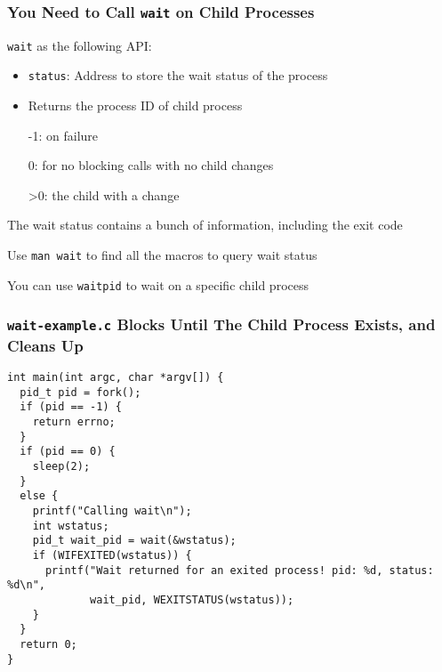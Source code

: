   \begin{frame}
    \frametitle{You Need to Call \texttt{wait} on Child Processes}

    \texttt{wait} as the following API:
    \begin{itemize}
      \item \texttt{status}: Address to store the wait status of the process
      \item Returns the process ID of child process

            \hspace{2em} -1: on failure

            \hspace{2em} 0: for no blocking calls with no child changes

            \hspace{2em} >0: the child with a change
    \end{itemize}

    \vspace{2em}

    The wait status contains a bunch of information, including the exit code

    \hspace{2em} Use \texttt{man wait} to find all the macros to query wait status

    \hspace{4em} You can use \texttt{waitpid} to wait on a specific child process
  \end{frame}

  \begin{frame}[fragile]
    \frametitle{\texttt{wait-example.c} Blocks Until The Child Process Exists, and Cleans Up}

    \begin{lstlisting}
int main(int argc, char *argv[]) {
  pid_t pid = fork();
  if (pid == -1) {
    return errno;
  }
  if (pid == 0) {
    sleep(2);
  }
  else {
    printf("Calling wait\n");
    int wstatus;
    pid_t wait_pid = wait(&wstatus);
    if (WIFEXITED(wstatus)) {
      printf("Wait returned for an exited process! pid: %d, status: %d\n",
             wait_pid, WEXITSTATUS(wstatus));
    }
  }
  return 0;
}
    \end{lstlisting}
  \end{frame}


